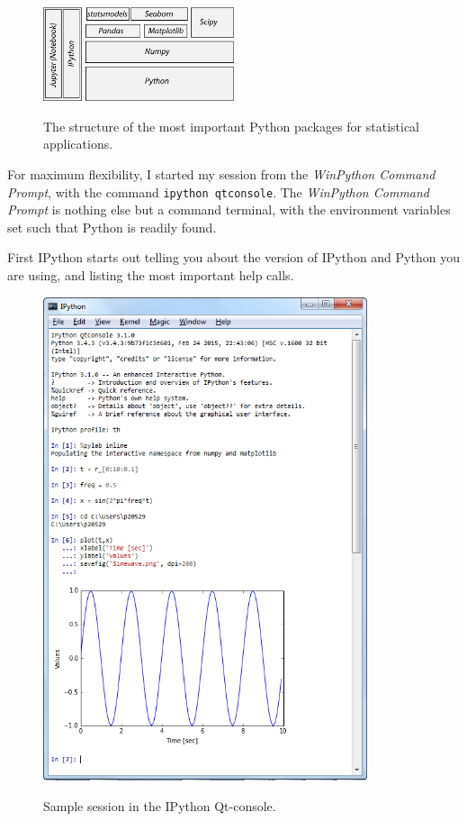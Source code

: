 \begin{figure}[h]
  \centering
  \includegraphics[width=0.5\textwidth]{../Images/ScientificPython.jpg}\\
  \caption{The structure of the most important Python packages for statistical applications.}
  \label{fig:scientificPython}
\end{figure}

For maximum flexibility, I started my session from the \emph{WinPython Command Prompt}, with the command \lstinline{ipython qtconsole}. The \emph{WinPython Command Prompt} is nothing else but a command terminal, with the environment variables set such that Python is readily found.

First IPython starts out telling you about the version of IPython and Python you are using, and listing the most important help calls.

\begin{figure}
  \centering
  \includegraphics[width=0.85\textwidth]{../Images/qtConsole.png}\\
  \caption{Sample session in the IPython Qt-console.}
  \label{fig:qtConsole}
\end{figure}


